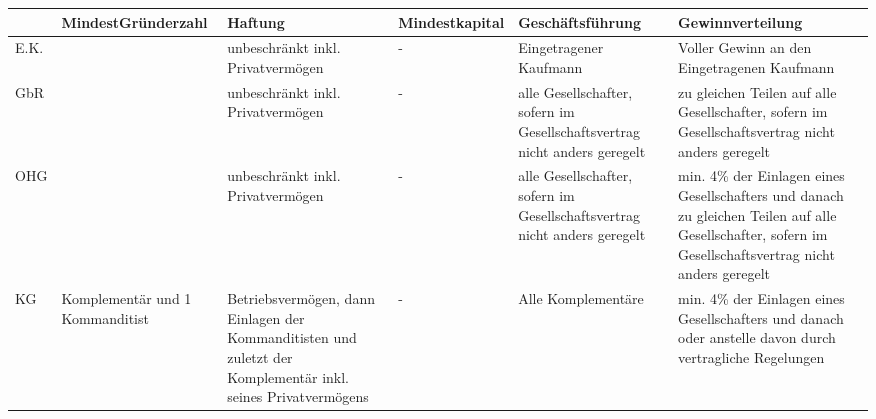 \begin{table}[H]
    \centering
    \begin{tabularx}{\textwidth}{|>{\raggedright\arraybackslash}l|>{\raggedright\arraybackslash}X|>{\raggedright\arraybackslash}X|>{\raggedright\arraybackslash}l|>{\raggedright\arraybackslash}X|>{\raggedright\arraybackslash}X|}
        \hline
             & Mindest\-Gründerzahl              & Haftung                                                                                                        & Mindest\-kapital & Geschäfts\-führung                                                        & Gewinn\-verteilung                                                                                                                                      \\
        \hline
        E.K. & 1                                 & unbeschränkt inkl. Privatvermögen                                                                              & -                & Eingetragener Kaufmann                                                    & Voller Gewinn an den Eingetragenen Kaufmann                                                                                                             \\
        \hline
        GbR  & 2                                 & unbeschränkt inkl. Privatvermögen                                                                              & -                & alle Gesellschafter, sofern im Gesellschaftsvertrag nicht anders geregelt & zu gleichen Teilen auf alle Gesellschafter, sofern im Gesellschaftsvertrag nicht anders geregelt                                                        \\
        \hline
        OHG  & 2                                 & unbeschränkt inkl. Privatvermögen                                                                              & -                & alle Gesellschafter, sofern im Gesellschaftsvertrag nicht anders geregelt & min. 4\% der Einlagen eines Gesellschafters und danach zu gleichen Teilen auf alle Gesellschafter, sofern im Gesellschaftsvertrag nicht anders geregelt \\
        \hline
        KG   & 1 Komplementär und 1 Kommanditist & Betriebs\-vermögen, dann Einlagen der Kommanditisten und zuletzt der Komplementär inkl. seines Privatvermögens & -                & Alle Komplementäre                                                        & min. 4\% der Einlagen eines Gesellschafters und danach oder anstelle davon durch vertragliche Regelungen                                                \\

\end{tabularx}
\end{table}
